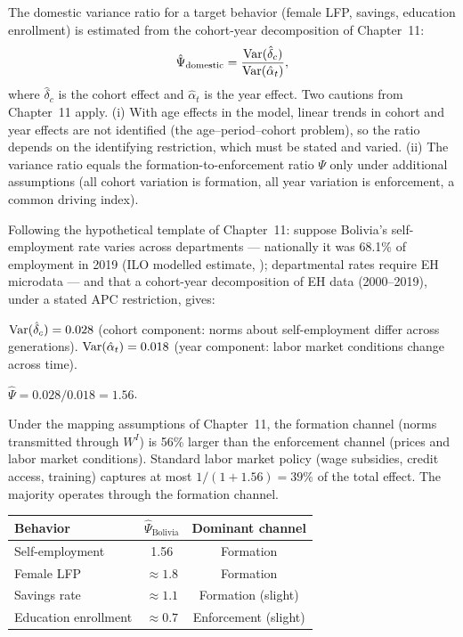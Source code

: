 \documentclass[../structural_economics_book.tex]{subfiles}
\begin{document}
\begin{definition}\label{ch17:def:domestic_psi}
The domestic variance ratio for a target behavior (female LFP, savings, education enrollment) is estimated from the cohort-year decomposition of Chapter~11:
\begin{equation}
\hat{\Psi}_{\text{domestic}} = \frac{\operatorname{Var}(\hat{\delta}_c)}{\operatorname{Var}(\hat{\alpha}_t)},
\end{equation}
where $\hat{\delta}_c$ is the cohort effect and $\hat{\alpha}_t$ is the year effect. Two cautions from Chapter~11 apply. (i) With age effects in the model, linear trends in cohort and year effects are not identified (the age--period--cohort problem), so the ratio depends on the identifying restriction, which must be stated and varied. (ii) The variance ratio equals the formation-to-enforcement ratio $\Psi$ only under additional assumptions (all cohort variation is formation, all year variation is enforcement, a common driving index).
\end{definition}

\begin{example}\label{ch17:ex:bolivia_psi}
Following the hypothetical template of Chapter~11: suppose Bolivia's self-employment rate varies across departments --- nationally it was 68.1\% of employment in 2019 (ILO modelled estimate, \citealp{worldbank2026wdi}); departmental rates require EH microdata --- and that a cohort-year decomposition of EH data (2000--2019), under a stated APC restriction, gives:

$\operatorname{Var}(\hat{\delta}_c) = 0.028$ (cohort component: norms about self-employment differ across generations). $\operatorname{Var}(\hat{\alpha}_t) = 0.018$ (year component: labor market conditions change across time).

$\hat{\Psi} = 0.028/0.018 = 1.56$.

Under the mapping assumptions of Chapter~11, the formation channel (norms transmitted through $W^I$) is 56\% larger than the enforcement channel (prices and labor market conditions). Standard labor market policy (wage subsidies, credit access, training) captures at most $1/(1+1.56) = 39\%$ of the total effect. The majority operates through the formation channel.

\begin{center}
\begin{tabular}{lcc}
\toprule
Behavior & $\hat{\Psi}_{\text{Bolivia}}$ & Dominant channel \\
\midrule
Self-employment & 1.56 & Formation \\
Female LFP & $\approx 1.8$ & Formation \\
Savings rate & $\approx 1.1$ & Formation (slight) \\
Education enrollment & $\approx 0.7$ & Enforcement (slight) \\
\bottomrule
\end{tabular}
\end{center}
\end{example}
\end{document}
